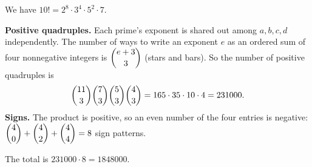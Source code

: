 We have $10!=2^8\cdot3^4\cdot5^2\cdot7$.

\textbf{Positive quadruples.} Each prime's exponent is shared out among $a,b,c,d$ independently. The number of ways to write an exponent $e$ as an ordered sum of four nonnegative integers is $\dbinom{e+3}{3}$ (stars and bars). So the number of positive quadruples is
\[\dbinom{11}{3}\dbinom{7}{3}\dbinom{5}{3}\dbinom{4}{3}=165\cdot35\cdot10\cdot4=231000.\]
\textbf{Signs.} The product is positive, so an even number of the four entries is negative: $\dbinom40+\dbinom42+\dbinom44=8$ sign patterns.

The total is $231000\cdot8=\boxed{1848000}$.
